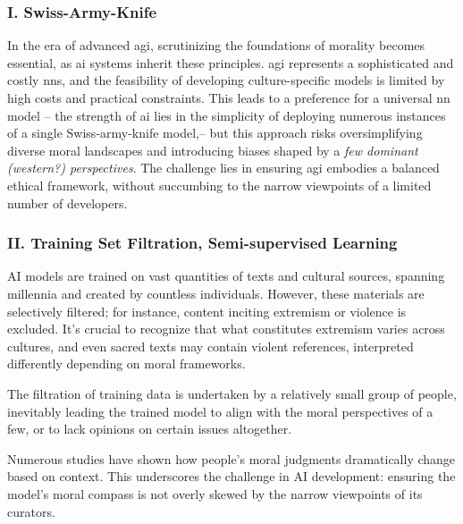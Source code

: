 \documentclass[11pt,a4]{article}
\begin{document}
\subsubsection{I. Swiss-Army-Knife}

In the era of advanced \acrshort{agi}, scrutinizing the foundations of
morality becomes essential, as \acrshort{ai} systems inherit
these principles.
\acrshort{agi} represents a sophisticated and costly \glspl{nn}, and
the feasibility of developing culture-specific models is
limited by high costs and practical constraints. This leads
to a preference for a universal \acrshort{nn} model -- the
strength of \acrshort{ai} lies in the simplicity of deploying numerous instances of a single Swiss-army-knife  model,--  but this approach
risks oversimplifying diverse moral landscapes and
introducing biases shaped by a \textit{few dominant
(western?) perspectives}. The challenge lies in
ensuring \acrshort{agi} embodies a balanced ethical framework,
without succumbing to the narrow viewpoints of a limited number of developers.

\subsubsection{II. Training Set Filtration, Semi-supervised Learning}
AI models are trained on vast quantities of texts and cultural sources,
spanning millennia and created by countless individuals. However,
these materials are selectively filtered; for instance, content
inciting extremism or violence is excluded. It's crucial to
recognize that what constitutes extremism varies across cultures,
and even sacred texts may contain violent references, interpreted
differently depending on moral frameworks.
\par
The filtration of training data is undertaken by a relatively
small group of people, inevitably leading the trained model
to align with the moral perspectives of a few, or to lack
opinions on certain issues altogether.
\par
Numerous studies have shown how people's moral judgments
dramatically change based on context. This underscores the
challenge in AI development: ensuring the model's moral
compass is not overly skewed by the narrow
viewpoints of its curators.
\end{document}
